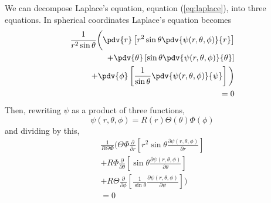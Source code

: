 We can decompose Laplace's equation, equation (\ref{eq:laplace}), into
three equations.  In spherical coordinates Laplace's equation becomes
\begin{equation}
  \begin{split}
    \frac{1}{r^2 \sin \theta} 
    \bigg( \pdv{r}      \left[r^2 \sin \theta \pdv{\psi(r, \theta, \phi)}{r} \right] \\ 
         + \pdv{\theta} \left[\sin \theta \pdv{\psi(r, \theta, \phi)}{\theta}\right] \\ 
         + \pdv{\phi}   \left[\frac{1}{\sin \theta} \pdv{\psi(r,\theta, \phi)}{\psi } \right] \bigg)\\ =0
    \end{split}
  \end{equation}
  Then, rewriting $\psi$ as a product of three functions,
  \[ \psi(r, \theta, \phi) = R(r)\Theta(\theta)\Phi(\phi) \] and
  dividing by this,
  \begin{equation*}
    \begin{split}
      \frac{1}{R \Theta \Phi} 
      \bigg( \Theta \Phi \frac{\partial}{\partial r} \left[r^2 \sin \theta \frac{\partial \psi(r, \theta, \phi)}{\partial r} \right] \\
           + R \Phi \frac{\partial}{\partial \theta} \left[ \sin \theta \frac{\partial \psi(r, \theta, \phi)}{\partial \theta}\right] \\ 
           + R \Theta \frac{\partial}{\partial \phi} \left[ \frac{1}{\sin \theta} \frac{\partial \psi(r, \theta, \phi)}{\partial \psi }\right]
      \bigg) \\=0
      \end{split}
    \end{equation*}

